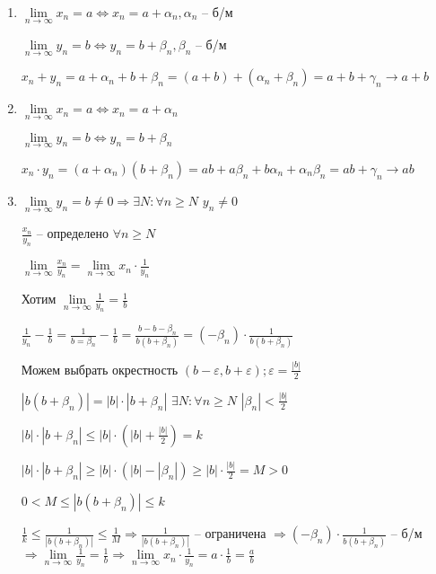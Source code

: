 \documentclass[14pt, letter paper]{article}
\begin{document}
\begin{enumerate}
    \item $\lim\limits_{n \rightarrow \infty}{x_n} = a \Leftrightarrow x_n = a + \alpha_n, \alpha_n$ -- б/м

    $\lim\limits_{n \rightarrow \infty}{y_n} = b \Leftrightarrow y_n = b + \beta_n, \beta_n$ -- б/м

    $x_n + y_n = a + \alpha_n + b + \beta_n = (a + b) + (\alpha_n + \beta_n) = a + b + \gamma_n \rightarrow a + b$

    \item $\lim\limits_{n \rightarrow \infty}{x_n} = a \Leftrightarrow x_n = a + \alpha_n$

    $\lim\limits_{n \rightarrow \infty}{y_n} = b \Leftrightarrow y_n = b + \beta_n$

    $x_n \cdot y_n = (a + \alpha_n)(b + \beta_n) = ab + a\beta_n + b\alpha_n + \alpha_n\beta_n = ab + \gamma_n \rightarrow ab$

    \item $\lim\limits_{n \rightarrow \infty}{y_n} = b \neq 0 \Rightarrow \exists N : \forall n \geq N$ $y_n \neq 0$

    $\frac{x_n}{y_n}$ -- определено $\forall n \geq N$

    $\lim\limits_{n \rightarrow \infty}{\frac{x_n}{y_n}} = \lim\limits_{n \rightarrow \infty}{x_n \cdot \frac{1}{y_n}}$

    Хотим $\lim\limits_{n \rightarrow \infty}{\frac{1}{y_n}} = \frac{1}{b}$

    $\frac{1}{y_n} - \frac{1}{b} = \frac{1}{b = \beta_n} - \frac{1}{b} = \frac{b - b - \beta_n}{b(b+\beta_n)} = (-\beta_n) \cdot \frac{1}{b(b + \beta_n)}$

    Можем выбрать окрестность $(b - \varepsilon, b + \varepsilon); \varepsilon = \frac{|b|}{2}$

    $|b(b + \beta_n)| = |b| \cdot |b + \beta_n|$ $\exists N : \forall n \geq N$ $|\beta_n| < \frac{|b|}{2}$

    $|b| \cdot |b + \beta_n| \leq |b| \cdot (|b| + \frac{|b|}{2}) = k$

    $|b| \cdot |b + \beta_n| \geq |b| \cdot (|b| - |\beta_n|) \geq |b| \cdot \frac{|b|}{2} = M > 0$

    $0 < M \leq |b(b + \beta_n)| \leq k$

    $\frac{1}{k} \leq \frac{1}{|b(b + \beta_n)|} \leq \frac{1}{M} \Rightarrow \frac{1}{|b(b + \beta_n)|}$ -- ограничена $\Rightarrow (-\beta_n) \cdot \frac{1}{b(b + \beta_n)}$ -- б/м $\Rightarrow \lim\limits_{n \rightarrow \infty}{\frac{1}{y_n}} = \frac{1}{b} \Rightarrow \lim\limits_{n \rightarrow \infty}{x_n \cdot \frac{1}{y_n}} = a \cdot \frac{1}{b} = \frac{a}{b}$


\end{enumerate}
\end{document}
